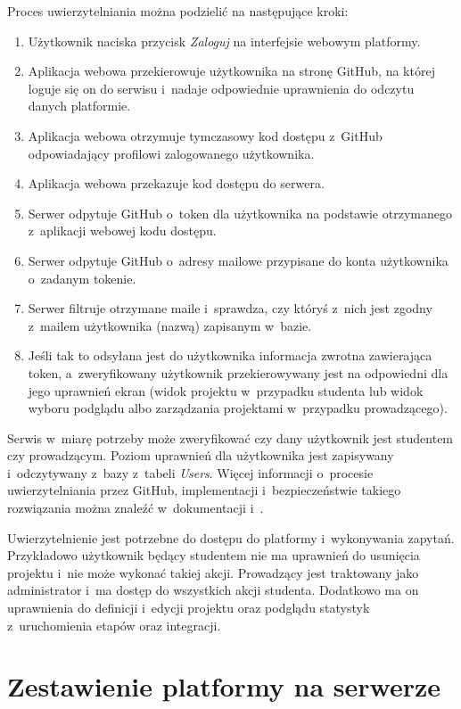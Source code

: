 Proces uwierzytelniania można podzielić na następujące kroki:
\begin{enumerate}
    \item Użytkownik naciska przycisk \textit{Zaloguj} na interfejsie webowym platformy.
    \item Aplikacja webowa przekierowuje użytkownika na stronę GitHub, na której loguje się on do serwisu i~nadaje odpowiednie uprawnienia do odczytu danych platformie.
    \item Aplikacja webowa otrzymuje tymczasowy kod dostępu z~GitHub odpowiadający profilowi zalogowanego użytkownika.
    \item Aplikacja webowa przekazuje kod dostępu do serwera.
    \item Serwer odpytuje GitHub o~token dla użytkownika na podstawie otrzymanego z~aplikacji webowej kodu dostępu.
    \item Serwer odpytuje GitHub o~adresy mailowe przypisane do konta użytkownika o~zadanym tokenie.
    \item Serwer filtruje otrzymane maile i~sprawdza, czy któryś z~nich jest zgodny z~mailem użytkownika (nazwą) zapisanym w~bazie.
    \item Jeśli tak to odsyłana jest do użytkownika informacja zwrotna zawierająca token, a~zweryfikowany użytkownik przekierowywany jest na odpowiedni dla jego uprawnień ekran (widok projektu w~przypadku studenta lub widok wyboru podglądu albo zarządzania projektami w~przypadku prowadzącego).
\end{enumerate}

Serwis w~miarę potrzeby może zweryfikować czy dany użytkownik jest studentem czy prowadzącym.
Poziom uprawnień dla użytkownika jest zapisywany i~odczytywany z~bazy z~tabeli \textit{Users}.
Więcej informacji o~procesie uwierzytelniania przez GitHub, implementacji i~bezpieczeństwie takiego rozwiązania można znaleźć w~dokumentacji \cite{gitHub-auth-basic} i~\cite{gitHub-oauth-app}.

Uwierzytelnienie jest potrzebne do dostępu do platformy i~wykonywania zapytań.
Przykładowo użytkownik będący studentem nie ma uprawnień do usunięcia projektu i~nie może wykonać takiej akcji.
Prowadzący jest traktowany jako administrator i~ma dostęp do wszystkich akcji studenta.
Dodatkowo ma on uprawnienia do definicji i~edycji projektu oraz podglądu statystyk z~uruchomienia etapów oraz integracji.

\section {Zestawienie platformy na serwerze}
\label{run-platform}


